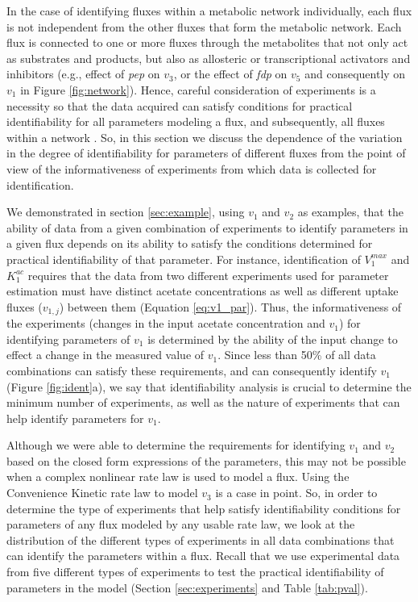 \documentclass[10pt]{article}
\begin{document}
	In the case of identifying fluxes within a metabolic network individually, each flux is not independent from the other fluxes that form the metabolic network. Each flux is connected to one or more fluxes through the metabolites that not only act as substrates and products, but also as allosteric or transcriptional activators and inhibitors (e.g., effect of \textit{pep} on $v_3$, or the effect of \textit{fdp} on $v_5$ and consequently on $v_1$ in Figure \ref{fig:network}). Hence, careful consideration of experiments is a necessity so that the data acquired can satisfy conditions for practical identifiability for all parameters modeling a flux, and subsequently, all fluxes within a network \parencite{Heijnen2013}. So, in this section we discuss the dependence of the variation in the degree of identifiability for parameters of different fluxes from the point of view of the informativeness of experiments from which data is collected for identification.	
	
	We demonstrated in section \ref{sec:example}, using $v_1$ and $v_2$ as examples, that the ability of data from a given combination of experiments to identify parameters in a given flux depends on its ability to satisfy the conditions determined for practical identifiability of that parameter. For instance, identification of $V_1^{max}$ and $K_1^{ac}$ requires that the data from two different experiments used for parameter estimation must have distinct acetate concentrations as well as different uptake fluxes ($v_{1,j}$) between them (Equation \ref{eq:v1_par}). Thus, the informativeness of the experiments (changes in the input acetate concentration and $v_1$) for identifying parameters of $v_1$ is determined by the ability of the input change to effect a change in the measured value of $v_1$.	Since less than 50\% of all data combinations can satisfy these requirements, and can consequently identify $v_1$ (Figure \ref{fig:ident}a), we say that identifiability analysis is crucial to determine the minimum number of experiments, as well as the nature of experiments that can help identify parameters for $v_1$. 
	
	Although we were able to determine the requirements for identifying $v_1$ and $v_2$ based on the closed form expressions of the parameters, this may not be possible when a complex nonlinear rate law is used to model a flux. Using the Convenience Kinetic rate law to model $v_3$ is a case in point. So, in order to determine the type of experiments that help satisfy identifiability conditions for parameters of any flux modeled by any usable rate law, we look at the distribution of the different types of experiments in all data combinations that can identify the parameters within a flux. Recall that we use experimental data from five different types of experiments to test the practical identifiability of parameters in the model (Section \ref{sec:experiments} and Table \ref{tab:pval}).
	
\end{document}
